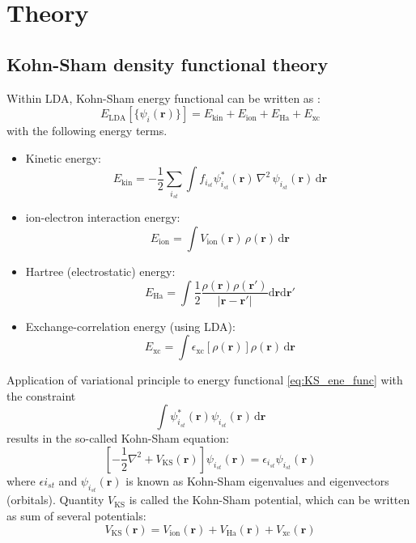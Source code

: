 \section{Theory}

\subsection{Kohn-Sham density functional theory}

Within LDA, Kohn-Sham energy functional can be written as \cite{Kohn1965}:
\begin{equation}
E_{\mathrm{LDA}}\left[\{\psi_{i}(\mathbf{r})\}\right] =
E_{\mathrm{kin}} + E_{\mathrm{ion}} + E_{\mathrm{Ha}} + E_{\mathrm{xc}}
\label{eq:KS_ene_func}
\end{equation}
with the following energy terms.
\begin{itemize}
\item Kinetic energy:
\begin{equation}
E_{\mathrm{kin}} = -\frac{1}{2}\sum_{i_{st}}
\int f_{i_{st}}
\psi_{i_{st}}^{*}(\mathbf{r})\,\nabla^2\,\psi_{i_{st}}(\mathbf{r})
\,\mathrm{d}\mathbf{r}
\end{equation}
%
\item ion-electron interaction energy:
\begin{equation}
E_{\mathrm{ion}} = \int V_{\mathrm{ion}}(\mathbf{r})\, \rho(\mathbf{r})\,
\mathrm{d}\mathbf{r}
\end{equation}
%
\item Hartree (electrostatic) energy:
\begin{equation}
E_{\mathrm{Ha}} = \int \frac{1}{2}
\dfrac{\rho(\mathbf{r})\rho(\mathbf{r}')}
{\left|\mathbf{r} - \mathbf{r}'\right|}
\mathrm{d}\mathbf{r}\mathrm{d}\mathbf{r}'
\end{equation}
%
\item Exchange-correlation energy (using LDA):
\begin{equation}
E_{\mathrm{xc}} = \int \epsilon_{\mathrm{xc}}\left[\rho(\mathbf{r})\right]
\rho(\mathbf{r})\,\mathrm{d}\mathbf{r}
\end{equation}
%
\end{itemize}

Application of variational principle to energy functional \ref{eq:KS_ene_func}
with the constraint
\begin{equation}
\int \psi^{*}_{i_{st}}(\mathbf{r}) \psi_{i_{st}}(\mathbf{r})\,\mathrm{d}\mathbf{r}
\end{equation}
results in the so-called Kohn-Sham equation:
\begin{equation}
\left[
-\frac{1}{2}\nabla^2  + V_{\mathrm{KS}}(\mathbf{r})
\right] \psi_{i_{st}}(\mathbf{r}) =
\epsilon_{i_{st}}\psi_{i_{st}}(\mathbf{r})
\end{equation}
where $\epsilon{i_{st}}$ and $\psi_{i_{st}}(\mathbf{r})$ is known as Kohn-Sham
eigenvalues and eigenvectors (orbitals).
Quantity $V_{\mathrm{KS}}$ is called the Kohn-Sham potential, which can be
written as sum of several potentials:
\begin{equation}
V_{\mathrm{KS}}(\mathbf{r}) = V_{\mathrm{ion}}(\mathbf{r}) + V_{\mathrm{Ha}}(\mathbf{r})
+ V_{\mathrm{xc}}(\mathbf{r})
\label{eq:KS-pot}
\end{equation}

